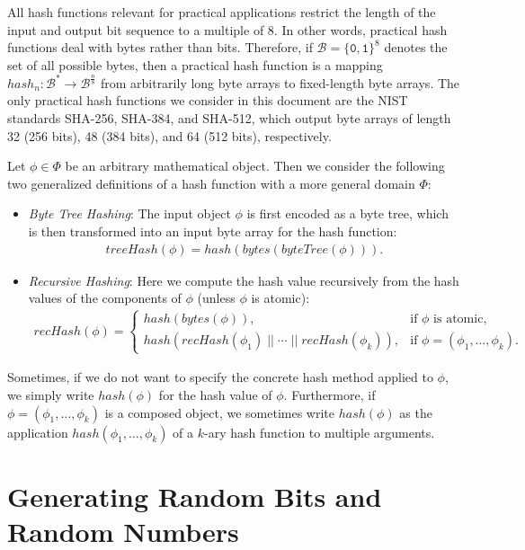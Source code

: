 \documentclass[bibtotoc,halfparskip,oneside]{scrreprt}
\newcommand{\bin}[1]{\ensuremath{\mathtt{#1}}}
\newcommand{\conc}{\ensuremath{\;||\;}}
\begin{document}
All hash functions relevant for practical applications restrict the length of the input and output bit sequence to a multiple of $8$. In other words, practical hash functions deal with bytes rather than bits. Therefore, if $\mathcal{B}=\{\bin{0},\bin{1}\}^8$ denotes the set of all possible bytes, then a practical hash function is a mapping $\mathit{hash}_n:\mathcal{B}^*\rightarrow\mathcal{B}^{\frac{n}{8}}$ from arbitrarily long byte arrays to fixed-length byte arrays. The only practical hash functions we consider in this document are the NIST standards SHA-256, SHA-384, and SHA-512, which output byte arrays of length 32 (256 bits), 48 (384 bits), and 64 (512 bits), respectively.

Let $\phi\in\Phi$ be an arbitrary mathematical object. Then we consider the following two generalized definitions of a hash function with a more general domain $\Phi$:
\begin{itemize}
	\item \emph{Byte Tree Hashing}: The input object $\phi$ is first encoded as a byte tree, which is then transformed into an input byte array for the hash function:
	\begin{align}
		\mathit{treeHash}(\phi)=\mathit{hash}(\mathit{bytes}(\mathit{byteTree}(\phi))).
	\end{align}
	\item \emph{Recursive Hashing}: Here we compute the hash value recursively from the hash values of the components of $\phi$ (unless $\phi$ is atomic):
	\begin{align}
		\mathit{recHash}(\phi)=
		\begin{cases}
			\mathit{hash}(\mathit{bytes}(\phi)), & \text{if $\phi$ is atomic}, \\
			\mathit{hash}(\mathit{recHash}(\phi_1)\conc\cdots\conc\mathit{recHash}(\phi_k)), & \text{if $\phi=(\phi_1,\ldots,\phi_k)$}.
		\end{cases}
	\end{align}
\end{itemize} 
Sometimes, if we do not want to specify the concrete hash method applied to $\phi$, we simply write $\mathit{hash}(\phi)$ for the hash value of $\phi$. Furthermore, if $\phi=(\phi_1,\ldots,\phi_k)$ is a composed object, we sometimes write $\mathit{hash}(\phi)$ as the application $\mathit{hash}(\phi_1,\ldots,\phi_k)$ of a $k$-ary hash function to multiple arguments.

\section{Generating Random Bits and Random Numbers} 
\end{document}
